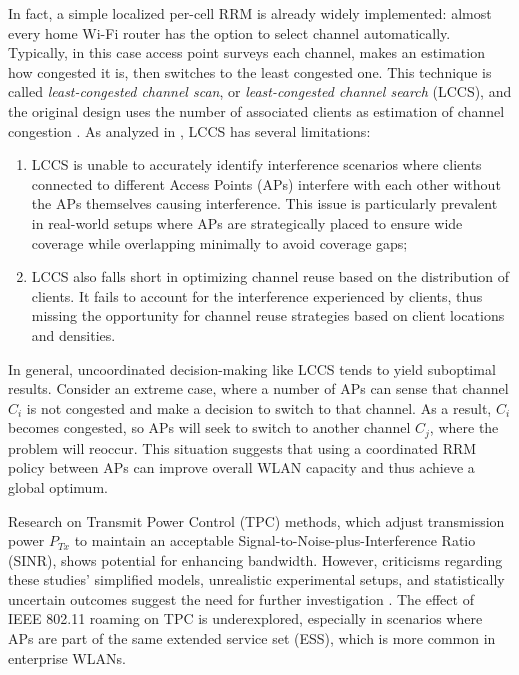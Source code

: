 In fact, a simple localized per-cell RRM is already widely implemented: almost every home Wi-Fi router has the option to select channel automatically. Typically, in this case access point surveys each channel, makes an estimation how congested it is, then switches to the least congested one. This technique is called \textit{least-congested channel scan}, or \textit{least-congested channel search} (LCCS), and the original design uses the number of associated clients as estimation of channel congestion \cite{achantaMethodApparatusLeast2006}.
As analyzed in \cite{aruneshmishraWeightedColoringBased2005}, LCCS has several limitations:
\begin{enumerate}
    \item LCCS is unable to accurately identify interference scenarios where clients connected to different Access Points (APs) interfere with each other without the APs themselves causing interference. This issue is particularly prevalent in real-world setups where APs are strategically placed to ensure wide coverage while overlapping minimally to avoid coverage gaps;
    \item LCCS also falls short in optimizing channel reuse based on the distribution of clients. It fails to account for the interference experienced by clients, thus missing the opportunity for channel reuse strategies based on client locations and densities.
\end{enumerate}

In general, uncoordinated decision-making like LCCS tends to yield suboptimal results. Consider an extreme case, where a number of APs can sense that channel $C_i$ is not congested and make a decision to switch to that channel. As a result, $C_i$ becomes congested, so APs will seek to switch to another channel $C_j$, where the problem will reoccur. This situation suggests that using a coordinated RRM policy between APs can improve overall WLAN capacity and thus achieve a global optimum.

Research on Transmit Power Control (TPC) methods, which adjust transmission power $P_{Tx}$ to maintain an acceptable Signal-to-Noise-plus-Interference Ratio (SINR), shows potential for enhancing bandwidth. However, criticisms regarding these studies' simplified models, unrealistic experimental setups, and statistically uncertain outcomes suggest the need for further investigation \cite{michalskiSimplePerformanceboostingAlgorithm2016,kazminIspolzovanieNeyronnyhSetey2021}. The effect of IEEE 802.11 roaming on TPC is underexplored, especially in scenarios where APs are part of the same extended service set (ESS), which is more common in enterprise WLANs.

